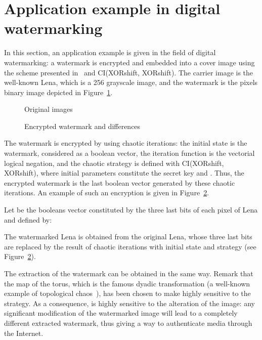 \documentclass[10pt, a4paper, conference, compsocconf]{IEEEtran}
\begin{document}
\section{Application example in digital watermarking}
\label{An application example of the proposed PRNG}



In this section, an application example is given in the field of digital watermarking: a watermark is encrypted and embedded into a cover image using the scheme presented in~\cite{guyeux10ter} and  CI(XORshift, XORshift). The carrier image is the well-known Lena, which is a 256 grayscale image, and the watermark is the  pixels binary image depicted in Figure~\ref{Original images}.


\begin{figure}[!t]
\centering
{}
\hfil
{}
\caption{Original images}
\label{Original images}
\end{figure}


\begin{figure}[!t]
\centering
{}
\hfil
{}
\caption{Encrypted watermark and differences}
\label{Encrypted watermark and differences}
\end{figure}

The watermark is encrypted by using chaotic iterations: the initial state  is the watermark, considered as a boolean vector, the iteration function is the vectorial logical negation, and the chaotic strategy  is defined with CI(XORshift, XORshift), where initial parameters constitute the secret key and . Thus, the encrypted watermark is the last boolean vector generated by these chaotic iterations. An example of such an encryption is given in Figure~\ref{Encrypted watermark and differences}.


Let  be the  booleans vector constituted by the three last bits of each pixel of Lena and  defined by:

The watermarked Lena  is obtained from the original Lena, whose three last bits are replaced by the result of  chaotic iterations with initial state  and strategy  (see Figure~\ref{Encrypted watermark and differences}).

The extraction of the watermark can be obtained in the same way. Remark that the map  of the torus, which is the famous dyadic transformation (a well-known example of topological chaos~\cite{Dev89}), has been chosen to make  highly sensitive to the strategy. As a consequence,  is highly sensitive to the alteration of the image: any significant modification of the watermarked image will lead to a completely different extracted watermark, thus giving a way to authenticate media through the Internet.
\end{document}
